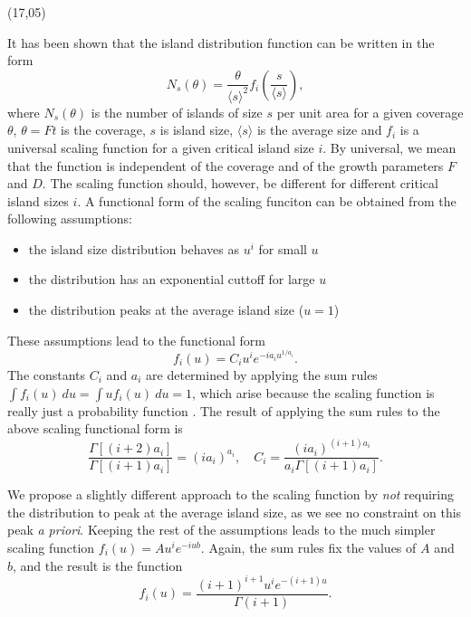 \documentclass{article}
\def\CHead#1{\begin{center}\noindent{\LARGE\color{darkblue} #1}\end{center}}
\renewcommand{\LARGE}{\fontsize{43}{54}\selectfont}
\begin{document}
\begin{textblock}{20}(17,05)
\CHead{Scaling Theory}
It has been shown that the island distribution function can be written in the
form\cite{crit}
\[
	N_s(\theta) = \frac{\theta}{\langle s \rangle^2} 
	f_i\left(\frac{s}{\langle s \rangle}\right),
\]
where $N_s(\theta)$ is the number of islands of size $s$ per unit area for a
given coverage $\theta$, $\theta = Ft$ is the coverage, $s$ is island size, 
$\langle s \rangle$ is the
average size and $f_i$ is a universal scaling function for a given critical
island size $i$. By universal, we mean
that the function is independent of the coverage and of the growth parameters
$F$ and $D$. The scaling function should, however, be different for different
critical island sizes $i$. A functional form of the scaling funciton can be
obtained from the following assumptions\cite{crit}:
\begin{itemize}
\item the island size distribution behaves as $u^i$ for small $u$
\item the distribution has an exponential cuttoff for large $u$
\item the distribution peaks at the average island size ($u=1$)
\end{itemize}
These assumptions lead to the functional form
\[
	f_i(u) = C_i u^i e^{-ia_i u^{1/a_i}}.
\]
The constants $C_i$ and $a_i$ are determined by applying the sum rules
$\int f_i(u) ~du = \int u f_i(u) ~du = 1$,
which arise because the scaling function is really just a probability function
\cite{1d}.
The result of applying the sum rules to the above scaling functional form is
\[
	\frac{\Gamma[(i+2)a_i]}{\Gamma[(i+1)a_i]} = (ia_i)^{a_i}, 
	\quad C_i = \frac{(ia_i)^{(i+1)a_i}}{a_i \Gamma[(i+1)a_i]}.
\]

We propose a slightly different approach to the scaling function by
\textit{not} requiring the distribution to peak at the average island size, as
we see no constraint on this peak \textit{a priori}.
Keeping the rest of the assumptions leads to the much simpler scaling function
$f_i(u) = A u^i e^{-iub}$.
Again, the sum rules fix the values of $A$ and $b$, and the result is the
function
\[
	f_i(u) = \frac{(i+1)^{i+1} u^i e^{-(i+1)u}}{\Gamma(i+1)}.
\]
\end{textblock}
\end{document}

